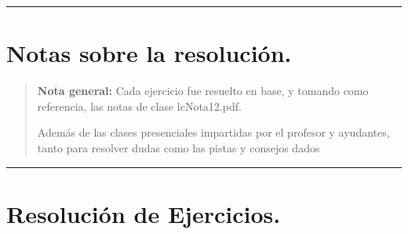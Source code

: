 \documentclass[12pt,letterpaper]{article}
\begin{document}
\bigskip
\hrule height 0.1pt
\bigskip

\section*{Notas sobre la resolución.}

\begin{quote}
  \textbf{Nota general:} Cada ejercicio fue resuelto en base, y tomando como referencia, las notas de clase lcNota12.pdf.
  
  Adem\'{a}s de las clases presenciales impartidas por el profesor y ayudantes, tanto para resolver dudas como las pistas y consejos dados
\end{quote}


\bigskip
\hrule height 0.1pt
\bigskip

\newpage

\section*{Resolución de Ejercicios.}
\end{document}
